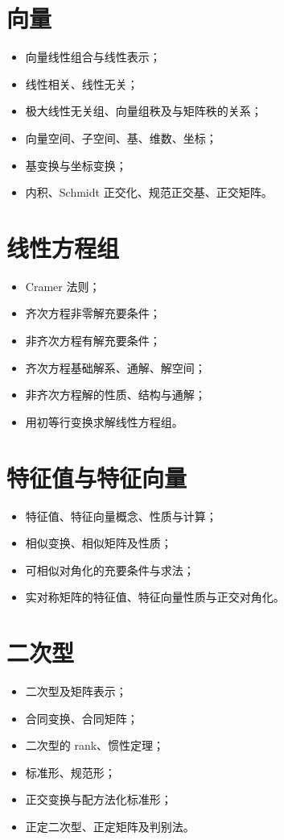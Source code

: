 \documentclass[11pt,a4paper,openany]{ctexbook}
\begin{document}
\section{向量}
\begin{itemize}
  \item 向量线性组合与线性表示；
  \item 线性相关、线性无关；
  \item 极大线性无关组、向量组秩及与矩阵秩的关系；
  \item 向量空间、子空间、基、维数、坐标；
  \item 基变换与坐标变换；
  \item 内积、Schmidt 正交化、规范正交基、正交矩阵。
\end{itemize}

\section{线性方程组}
\begin{itemize}
  \item Cramer 法则；
  \item 齐次方程非零解充要条件；
  \item 非齐次方程有解充要条件；
  \item 齐次方程基础解系、通解、解空间；
  \item 非齐次方程解的性质、结构与通解；
  \item 用初等行变换求解线性方程组。
\end{itemize}

\section{特征值与特征向量}
\begin{itemize}
  \item 特征值、特征向量概念、性质与计算；
  \item 相似变换、相似矩阵及性质；
  \item 可相似对角化的充要条件与求法；
  \item 实对称矩阵的特征值、特征向量性质与正交对角化。
\end{itemize}

\section{二次型}
\begin{itemize}
  \item 二次型及矩阵表示；
  \item 合同变换、合同矩阵；
  \item 二次型的 rank、惯性定理；
  \item 标准形、规范形；
  \item 正交变换与配方法化标准形；
  \item 正定二次型、正定矩阵及判别法。
\end{itemize}
\end{document}
